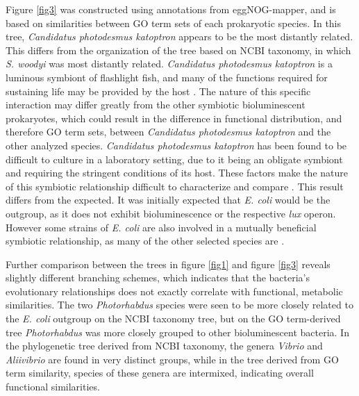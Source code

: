 \documentclass[fleqn,12pt]{wlscirep}
\begin{document}
Figure \ref{fig3} was constructed using annotations from eggNOG-mapper, and is based on similarities between GO term sets of each prokaryotic species. In this tree, \textit{Candidatus photodesmus katoptron} appears to be the most distantly related. This differs from the organization of the tree based on NCBI taxonomy, in which \textit{S. woodyi} was most distantly related. \textit{Candidatus photodesmus katoptron} is a luminous symbiont of flashlight fish, and many of the functions required for sustaining life may be provided by the host \cite{24}. The nature of this specific interaction may differ greatly from the other symbiotic bioluminescent prokaryotes, which could result in the difference in functional distribution, and therefore GO term sets, between \textit{Candidatus photodesmus katoptron} and the other analyzed species. \textit{Candidatus photodesmus katoptron} has been found to be difficult to culture in a laboratory setting, due to it being an obligate symbiont and requiring the  stringent conditions of its host. These factors make the nature of this symbiotic relationship difficult to characterize and compare \cite{t3}. This result differs from the expected. It was initially expected that \textit{E. coli} would be the outgroup, as it does not exhibit bioluminescence or the respective \textit{lux} operon. However some strains of \textit{E. coli} are also involved in a mutually beneficial symbiotic relationship, as many of the other selected species are \cite{d9}.

Further comparison between the trees in figure \ref{fig1} and figure \ref{fig3} reveals slightly different branching schemes, which indicates that the bacteria’s evolutionary relationships does not exactly correlate with functional, metabolic similarities. The two \textit{Photorhabdus} species were seen to be more closely related to the \textit{E. coli} outgroup on the NCBI taxonomy tree, but on the GO term-derived tree \textit{Photorhabdus} was more closely grouped to other bioluminescent bacteria. In the phylogenetic tree derived from NCBI taxonomy, the genera \textit{Vibrio} and \textit{Aliivibrio} are found in very distinct groups, while in the tree derived from GO term similarity, species of these genera are intermixed, indicating overall functional similarities.
\end{document}
